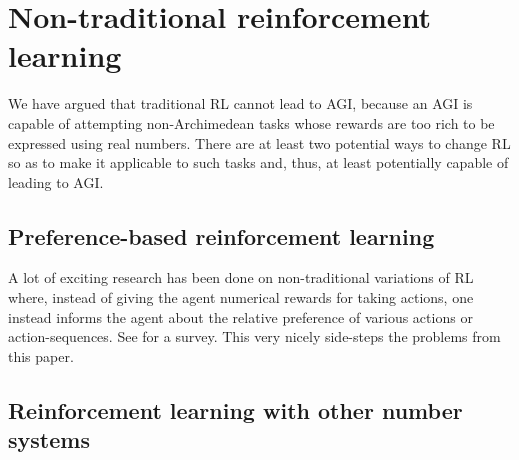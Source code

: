 \documentclass[reqno]{article}
\theoremstyle{definition}
\begin{document}
\section{Non-traditional reinforcement learning}
\label{nontraditionalsection}

We have argued that traditional RL cannot lead to AGI, because
an AGI is capable of attempting non-Archimedean tasks whose rewards are
too rich to be expressed using real numbers. There are at least two
potential ways to change RL so as to make it applicable to such tasks and,
thus, at least potentially capable of leading to AGI.

\subsection{Preference-based reinforcement learning}

A lot of exciting research has been done on non-traditional variations
of RL where, instead of giving the agent numerical rewards for taking actions,
one instead informs the agent about the relative preference of various
actions or action-sequences. See \cite{wirth2017survey} for a survey.
This very nicely side-steps the problems from this paper.


\subsection{Reinforcement learning with other number systems}
\end{document}
